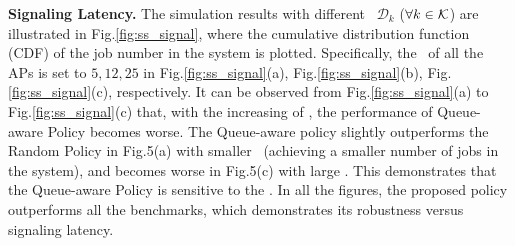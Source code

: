 


\noindent\textbf{Signaling Latency.}
The simulation results with different \brlatency~$\mathcal{D}_{k}$ ($\forall k\in\mathcal{K}$) are illustrated in Fig.\ref{fig:ss_signal}, where the cumulative distribution function (CDF) of the job number in the system is plotted.
Specifically, the \brlatency~of all the APs is set to $5, 12, 25$ in Fig.\ref{fig:ss_signal}(a), Fig.\ref{fig:ss_signal}(b), Fig.\ref{fig:ss_signal}(c), respectively.
It can be observed from Fig.\ref{fig:ss_signal}(a) to Fig.\ref{fig:ss_signal}(c) that, with the increasing of \brlatency, the performance of Queue-aware Policy becomes worse.
The Queue-aware policy slightly outperforms the Random Policy in Fig.5(a) with smaller \brlatency~(achieving a smaller number of jobs in the system), and becomes worse in Fig.5(c) with large \brlatency.
This demonstrates that the Queue-aware Policy is sensitive to the \brlatency.
In all the figures, the proposed policy outperforms all  the benchmarks, which demonstrates its robustness versus signaling latency.

